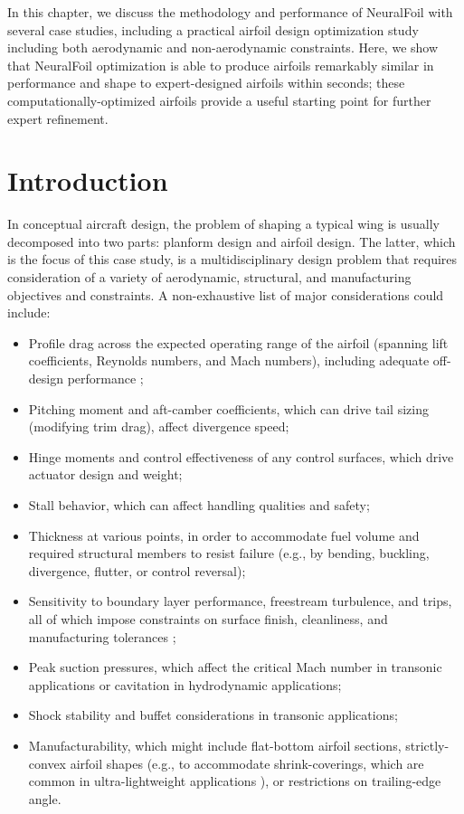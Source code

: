In this chapter, we discuss the methodology and performance of NeuralFoil with several case studies, including a practical airfoil design optimization study including both aerodynamic and non-aerodynamic constraints. Here, we show that NeuralFoil optimization is able to produce airfoils remarkably similar in performance and shape to expert-designed airfoils within seconds; these computationally-optimized airfoils provide a useful starting point for further expert refinement.


    \section{Introduction}

    In conceptual aircraft design, the problem of shaping a typical wing is usually decomposed into two parts: planform design and airfoil design. The latter, which is the focus of this case study, is a multidisciplinary design problem that requires consideration of a variety of aerodynamic, structural, and manufacturing objectives and constraints. A non-exhaustive list of major considerations could include:
    \begin{itemize}
        \item Profile drag across the expected operating range of the airfoil (spanning lift coefficients, Reynolds numbers, and Mach numbers), including adequate off-design performance \cite{drela_pros_1998};
        \item Pitching moment and aft-camber coefficients, which can drive tail sizing (modifying trim drag), affect divergence speed;
        \item Hinge moments and control effectiveness of any control surfaces, which drive actuator design and weight;
        \item Stall behavior, which can affect handling qualities and safety;
        \item Thickness at various points, in order to accommodate fuel volume and required structural members to resist failure (e.g., by bending, buckling, divergence, flutter, or control reversal);\cite{sharpe_tailerons_2023}
        \item Sensitivity to boundary layer performance, freestream turbulence, and trips, all of which impose constraints on surface finish, cleanliness, and manufacturing tolerances \cite{eleshaky1993airfoil, selig_highlift_1997, liebeck1973class};
        \item Peak suction pressures, which affect the critical Mach number in transonic applications or cavitation in hydrodynamic applications;
        \item Shock stability and buffet considerations in transonic applications;
        \item Manufacturability, which might include flat-bottom airfoil sections, strictly-convex airfoil shapes (e.g., to accommodate shrink-coverings, which are common in ultra-lightweight applications \cite{drela_lowreynoldsnumber_1988}), or restrictions on trailing-edge angle.
    \end{itemize}

